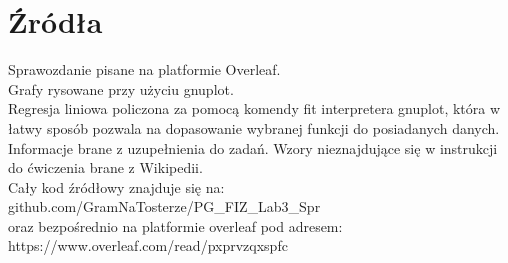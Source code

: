 \documentclass[11pt,a4paper]{article}
\begin{document}
\section{Źródła}
    Sprawozdanie pisane na platformie Overleaf. \\
    Grafy rysowane przy użyciu gnuplot. \\
    Regresja liniowa policzona za pomocą komendy fit interpretera gnuplot, która w łatwy sposób pozwala na dopasowanie wybranej funkcji do posiadanych danych. \\
    Informacje brane z uzupełnienia do zadań. Wzory nieznajdujące się w instrukcji do ćwiczenia brane z Wikipedii. \\
    Cały kod źródłowy znajduje się na: \\github.com/GramNaTosterze/PG\_FIZ\_Lab3\_Spr \\oraz bezpośrednio na platformie overleaf pod adresem:\\ https://www.overleaf.com/read/pxprvzqxspfc
\end{document}
